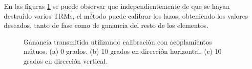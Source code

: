 En las figuras \ref{fig:deadTRMsMutual} se puede observar que independientemente de que se hayan destruído varios TRMs, el 
método puede calibrar los lazos, obteniendo los valores deseados, tanto de fase como de ganancia del resto de los elementos.
\begin{figure}[H]
	\centering
 	
		\caption{Ganancia transmitida utilizando calibración con acoplamientos mútuos. (a) 0 grados. (b) 10 grados en 
		dirección horizontal. (c) 10 grados en dirección vertical.}
	\label{fig:deadTRMsMutual}
\end{figure}

